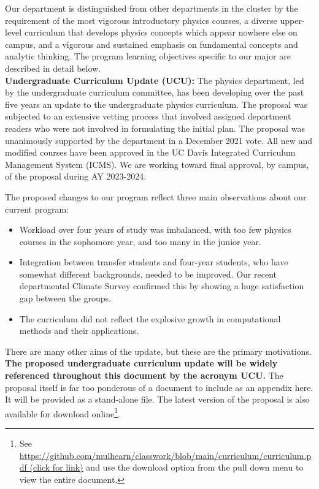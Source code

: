 \documentclass[12pt]{article}
\begin{document}
Our department is distinguished from other departments in the cluster
by the requirement of the most vigorous introductory physics courses,
a diverse upper-level curriculum that develops physics concepts which
appear nowhere else on campus, and a vigorous and sustained emphasis
on fundamental concepts and analytic thinking.  The program learning
objectives specific to our major are described in detail below.\\[3pt]

\noindent
{\bf Undergraduate Curriculum Update (UCU):}
The physics department, led by the undergraduate curriculum committee,
has been developing over the past five years an update to the
undergraduate physics curriculum.  The proposal was subjected to an
extensive vetting process that involved assigned department readers
who were not involved in formulating the initial plan.  The proposal
was unanimously supported by the department in a December 2021 vote.
All new and modified courses have been approved in the UC Davis
Integrated Curriculum Management System (ICMS).  We are working toward
final approval, by campus, of the proposal during AY 2023-2024.

The proposed changes to our program reflect three main observations
about our current program:
\begin{itemize}
 \item Workload over four years of study was imbalanced, with too few
   physics courses in the sophomore year, and too many in the junior
   year.
 \item Integration between transfer students and four-year students,
   who have somewhat different backgrounds, needed to be improved. Our
   recent departmental Climate Survey confirmed this by showing a huge
   satisfaction gap between the groups.
 \item The curriculum did not reflect the explosive growth in
   computational methods and their applications.
\end{itemize}

There are many other aims of the update, but these are the primary
motivations. {\bf The proposed undergraduate curriculum update will be widely
  referenced throughout this document by the acronym UCU.}  The
proposal itself is far too ponderous of a document to include as an
appendix here.  It will be provided as a stand-alone file.  The latest
version of the proposal is also available for download
online\footnote{ See
  \href{https://github.com/mulhearn/classwork/blob/main/curriculum/curriculum.pdf}
  {https://github.com/mulhearn/classwork/blob/main/curriculum/curriculum.pdf
    (click for link)} and use the download option from the pull down menu to view
  the entire document.  }.\\[3pt]
  
\end{document}
